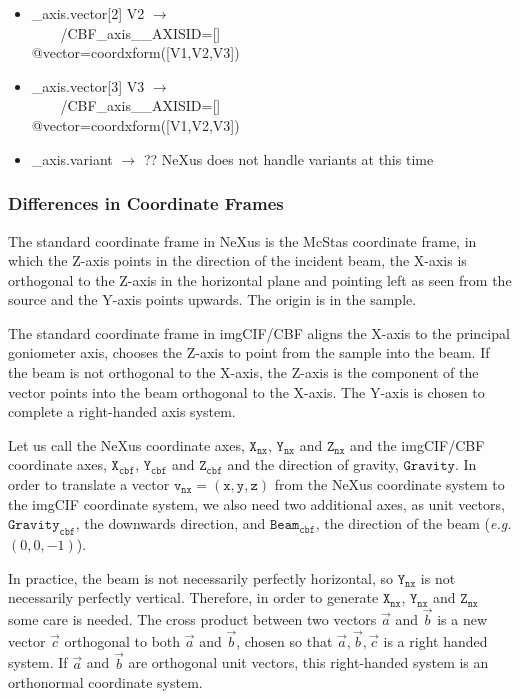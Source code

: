 \documentclass[11pt]{article}
\begin{document}
{\begin{itemize}
\item{\_axis.vector[2] V2 $\rightarrow$ \\
\verb|    |/CBF\_axis\_\_AXISID=[]\\
  @vector=coordxform([V1,V2,V3])}

\item{\_axis.vector[3] V3 $\rightarrow$ \\
\verb|    |/CBF\_axis\_\_AXISID=[]\\
  @vector=coordxform([V1,V2,V3])}

\item{\_axis.variant $\rightarrow$ ??  NeXus does not handle variants at this time}
\end{itemize}


\subsubsection{Differences in Coordinate Frames}

The standard coordinate frame in NeXus is the McStas coordinate frame, in which the Z-axis
points in the direction of the incident beam, the X-axis is orthogonal to the Z-axis in the horizontal
plane and pointing left as seen from the source and the Y-axis points upwards.  The origin is in the
sample.

The standard coordinate frame in imgCIF/CBF aligns the X-axis to the principal goniometer axis,
chooses the Z-axis to point from the sample into the beam.  If the beam is not orthogonal
to the X-axis, the Z-axis is the component of the vector points into the beam orthogonal to the
X-axis.  The Y-axis is chosen to complete a right-handed axis system.

Let us call the NeXus coordinate axes, $\mathtt{X_{nx}}$, $\mathtt{Y_{nx}}$ and $\mathtt{Z_{nx}}$ and the imgCIF/CBF
coordinate axes, $\mathtt{X_{cbf}}$, $\mathtt{Y_{cbf}}$ and $\mathtt{Z_{cbf}}$ and the direction of gravity, $\mathtt{Gravity}$.  In order
to translate a vector $\mathtt{v_{nx} = \left( x, y, z \right)}$ from the NeXus coordinate system to the 
imgCIF coordinate system, we also need two additional axes, as unit vectors, $\mathtt{Gravity_{cbf}}$, 
the downwards direction, and  $\mathtt{Beam_{cbf}}$, the direction of the beam ({\it e.g.} $\left( 0, 0, -1\right)$).   

In practice, the beam is not necessarily perfectly horizontal, so $\mathtt{Y_{nx}}$ is not necessarily
perfectly vertical. Therefore, in order to generate $\mathtt{X_{nx}}$, $\mathtt{Y_{nx}}$ and $\mathtt{Z_{nx}}$ some care
is needed.  The cross product between two vectors $\overrightarrow{a}$ and $\overrightarrow{b}$ 
is a new vector $\overrightarrow{c}$ orthogonal to both   $\overrightarrow{a}$ and $\overrightarrow{b}$,
chosen so that $\overrightarrow{a}, \overrightarrow{b}, \overrightarrow{c}$ is a right handed system.
If $\overrightarrow{a}$ and $\overrightarrow{b}$ are orthogonal unit vectors, this right-handed system
is an orthonormal coordinate system.

}
\end{document}
